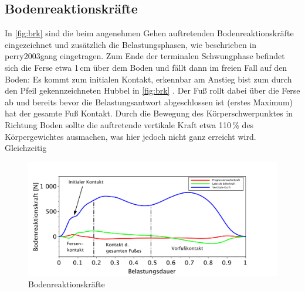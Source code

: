 \subsection{Bodenreaktionskräfte}
In \autoref{fig:brk} sind die beim angenehmen Gehen auftretenden Bodenreaktionskräfte eingezeichnet und zusätzlich die Belastungsphasen, wie beschrieben in perry2003gang eingetragen. Zum Ende der terminalen Schwungphase befindet sich die Ferse etwa 1\,cm über dem Boden und fällt dann im freien Fall auf den Boden: Es kommt zum initialen Kontakt, erkennbar am Anstieg bist zum durch den Pfeil gekennzeichneten Hubbel in \autoref{fig:brk} . Der Fuß rollt dabei über die Ferse ab und bereits bevor die Belastungsantwort abgeschlossen ist (erstes Maximum) hat der gesamte Fuß Kontakt. Durch die Bewegung des Körperschwerpunktes in Richtung Boden sollte die auftretende vertikale Kraft etwa 110\,\% des Körpergewichtes ausmachen, was hier jedoch nicht ganz erreicht wird. Gleichzeitig 
\begin{figure}[h!]
	\includegraphics[width=\linewidth]{bilder/Ergebnisse/brk_annotations.pdf}
	\caption{Bodenreaktionskräfte}
	\label{fig:brk}
\end{figure}




